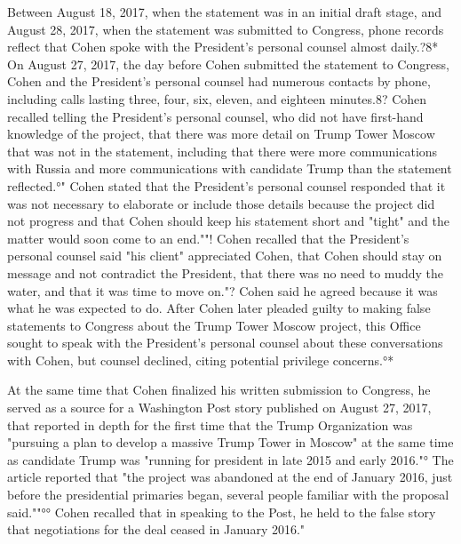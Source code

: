 Between August 18, 2017, when the statement was in an initial draft stage, and August 28, 2017, when the statement was submitted to Congress, phone records reflect that Cohen spoke with the President's personal counsel almost daily.?8*
On August 27, 2017, the day before Cohen submitted the statement to Congress, Cohen and the President's personal counsel had numerous contacts by phone, including calls lasting three, four, six, eleven, and eighteen minutes.8?
Cohen recalled telling the President's personal counsel, who did not have first-hand knowledge of the project, that there was more detail on Trump Tower Moscow that was not in the statement, including that there were more communications with Russia and more communications with candidate Trump than the statement reflected.°"
Cohen stated that the President's personal counsel responded that it was not necessary to elaborate or include those details because the project did not progress and that Cohen should keep his statement short and "tight" and the matter would soon come to an end.""!
Cohen recalled that the President's personal counsel said "his client" appreciated Cohen, that Cohen should stay on message and not contradict the President, that there was no need to muddy the water, and that it was time to move on."?
Cohen said he agreed because it was what he was expected to do.
After Cohen later pleaded guilty to making false statements to Congress about the Trump Tower Moscow project, this Office sought to speak with the President's personal counsel about these conversations with Cohen, but counsel declined, citing potential privilege concerns.°*

At the same time that Cohen finalized his written submission to Congress, he served as a source for a Washington Post story published on August 27, 2017, that reported in depth for the first time that the Trump Organization was "pursuing a plan to develop a massive Trump Tower in Moscow" at the same time as candidate Trump was "running for president in late 2015 and early 2016."°
The article reported that "the project was abandoned at the end of January 2016, just before the presidential primaries began, several people familiar with the proposal said.""°°
Cohen recalled that in speaking to the Post, he held to the false story that negotiations for the deal ceased in January 2016."

